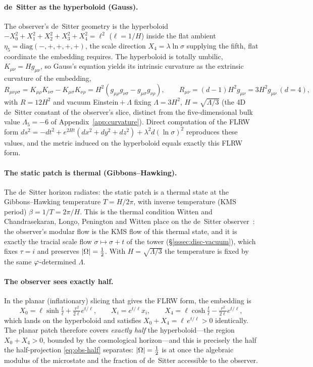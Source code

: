\paragraph{de~Sitter as the hyperboloid (Gauss).} The observer's de~Sitter geometry is the
hyperboloid $-X_0^2+X_1^2+X_2^2+X_3^2+X_4^2=\ell^2$ ($\ell=1/H$) inside the flat ambient
$\eta_5=\mathrm{diag}(-,+,+,+,+)$, the scale direction $X_4=\lambda\ln\sigma$ supplying the fifth,
flat coordinate the embedding requires. The hyperboloid is totally umbilic, $K_{\mu\nu}=H g_{\mu\nu}$,
so Gauss's equation yields its intrinsic curvature as the extrinsic curvature of the embedding,
\[
  R_{\mu\nu\rho\sigma}=K_{\mu\rho}K_{\nu\sigma}-K_{\mu\sigma}K_{\nu\rho}
    =H^2\!\left(g_{\mu\rho}g_{\nu\sigma}-g_{\mu\sigma}g_{\nu\rho}\right),\qquad
  R_{\mu\nu}=(d-1)H^2 g_{\mu\nu}=3H^2 g_{\mu\nu}\ (d=4),
\]
with $R=12H^2$ and vacuum Einstein${}+\Lambda$ fixing $\Lambda=3H^2$, $H=\sqrt{\Lambda/3}$ (the 4D
de~Sitter constant of the observer's slice, distinct from the five-dimensional bulk value
$\Lambda_5=-6$ of Appendix~\ref{app:curvature}). Direct computation of the FLRW form
$ds^2=-dt^2+e^{2Ht}(dx^2+dy^2+dz^2)+\lambda^2 d(\ln\sigma)^2$ reproduces these values, and the metric
induced on the hyperboloid equals exactly this FLRW form.

\paragraph{The static patch is thermal (Gibbons--Hawking).} The de~Sitter horizon radiates: the
static patch is a thermal state at the Gibbons--Hawking temperature $T=H/2\pi$, with inverse
temperature (KMS period) $\beta=1/T=2\pi/H$. This is the thermal condition Witten and
Chandrasekaran, Longo, Penington and Witten place on the de~Sitter
observer~\cite{Witten01dS,CLPW22}: the observer's modular flow is the KMS flow of this thermal
state, and it is exactly the tracial scale flow $\sigma\mapsto\sigma+t$ of the tower
(\S\ref{sssec:disc-vacuum}), which fixes $\tau=i$ and preserves $|\Omega|=\tfrac12$. With
$H=\sqrt{\Lambda/3}$ the temperature is fixed by the same $\varphi$-determined $\Lambda$.

\paragraph{The observer sees exactly half.} In the planar (inflationary) slicing that gives the FLRW
form, the embedding is
\[
  X_0=\ell\sinh\tfrac{t}{\ell}+\tfrac{r^2}{2\ell}e^{t/\ell},\qquad
  X_i=e^{t/\ell}x_i,\qquad
  X_4=\ell\cosh\tfrac{t}{\ell}-\tfrac{r^2}{2\ell}e^{t/\ell},
\]
which lands on the hyperboloid and satisfies $X_0+X_4=\ell\,e^{t/\ell}>0$ identically. The planar
patch therefore covers \emph{exactly half} the hyperboloid---the region $X_0+X_4>0$, bounded by the
cosmological horizon---and this is precisely the half the half-projection \eqref{eq:obs-half}
separates: $|\Omega|=\tfrac12$ is at once the algebraic modulus of the microstate and the fraction of
de~Sitter accessible to the observer.

